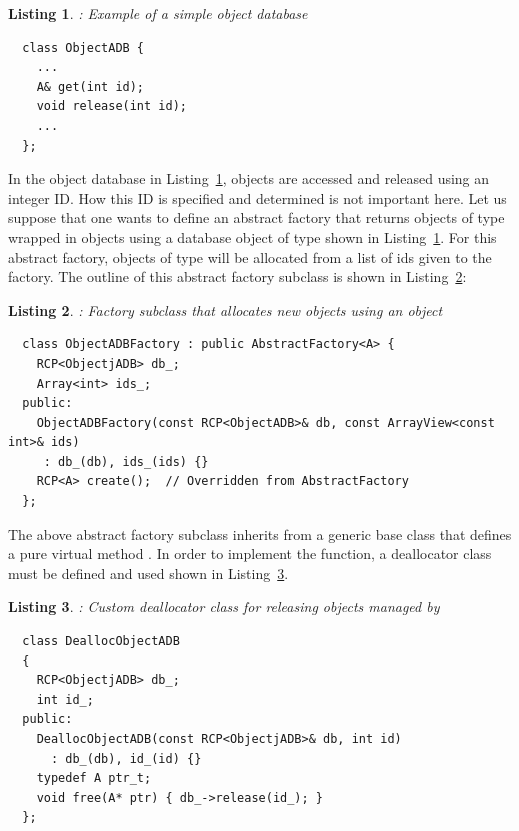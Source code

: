 \documentclass[pdf,ps2pdf,11pt]{SANDreport}
\newtheorem{listing}{Listing}
\begin{document}
{}\begin{listing}: Example of a simple object database
\label{listing:ObjectADB}
{\small\begin{verbatim}
  class ObjectADB {
    ...
    A& get(int id);
    void release(int id);
    ...
  };
\end{verbatim}}
\end{listing}


In the object database in Listing~\ref{listing:ObjectADB}, objects
are accessed and released using an integer ID.  How this ID is
specified and determined is not important here.  Let us suppose that
one wants to define an abstract factory that returns objects of type
{} wrapped in {} objects using a database object of
type {} shown in Listing~\ref{listing:ObjectADB}.
For this abstract factory, objects of type {} will be allocated
from a list of ids given to the factory.  The outline of this abstract
factory subclass is shown in Listing~\ref{listing:ObjectADBFactory}:


{}\begin{listing}: Factory subclass that allocates new objects using
an {} object
\label{listing:ObjectADBFactory}
{\small\begin{verbatim}
  class ObjectADBFactory : public AbstractFactory<A> {
    RCP<ObjectjADB> db_;
    Array<int> ids_;
  public:
    ObjectADBFactory(const RCP<ObjectADB>& db, const ArrayView<const int>& ids)
     : db_(db), ids_(ids) {}
    RCP<A> create();  // Overridden from AbstractFactory
  };
\end{verbatim}}
\end{listing}


The above abstract factory subclass {} inherits
from a generic {} base class that defines a pure
virtual method {}.  In order to implement the
{} function, a deallocator class must be defined and
used shown in Listing~\ref{listing:DeallocObjectADB}.


{}\begin{listing}: Custom deallocator class for releasing objects
managed by {}
\label{listing:DeallocObjectADB}
{\small\begin{verbatim}
  class DeallocObjectADB
  {
    RCP<ObjectjADB> db_;
    int id_;
  public:
    DeallocObjectADB(const RCP<ObjectjADB>& db, int id)
      : db_(db), id_(id) {}
    typedef A ptr_t;
    void free(A* ptr) { db_->release(id_); }
  };
\end{verbatim}}
\end{listing}
\end{document}
